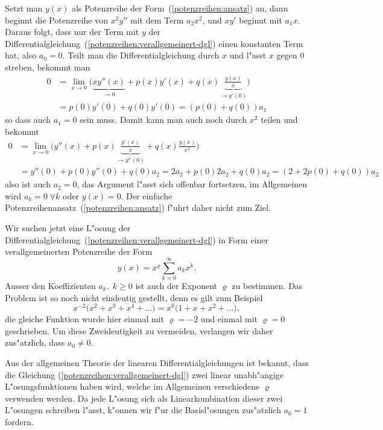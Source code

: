 Setzt man $y(x)$ als Potenzreihe der Form~(\ref{potenzreihen:ansatz}) an,
dann beginnt die Potenzreihe von $x^2y''$ mit dem Term $a_2x^2$,
und $xy'$ beginnt mit $a_1x$.
Daraus folgt, dass nur der Term mit $y$ der
Differentialgleichung~(\ref{potenzreihen:verallgemeinert-dgl})
einen konstanten Term hat, also $a_0=0$.
Teilt man die Differentialgleichung durch $x$ und l"asst $x$ gegen $0$
streben, bekommt man
\begin{align*}
0&=
\lim_{x\to 0}\biggl(
\underbrace{xy''(x)}_{\to 0}+p(x)y'(x)+q(x)\underbrace{\frac{y(x)}{x}}_{\to y'(0)}\biggr)
\\
&=
p(0)y'(0)+q(0)y'(0)
=(p(0)+q(0))a_1
\end{align*}
so dass auch $a_1=0$ sein muss.
Damit kann man auch noch durch $x^2$ teilen und bekommt
\begin{align*}
0&=
\lim_{x\to 0}\biggl(
y''(x)+p(x)\underbrace{\frac{y'(x)}{x}}_{\to y''(0)}+q(x)\frac{y(x)}{x^2}
\biggr)
\\
&=y''(0)+p(0)y''(0)+q(0)a_2
=2a_2+p(0)2a_2+q(0)a_2
=(2+2p(0)+q(0))a_2
\end{align*}
also ist auch $a_2=0$, das Argument l"asst sich offenbar fortsetzen, 
im Allgemeinen wird $a_k=0\;\forall k$ oder $y(x)=0$.
Der einfache Potenzreihenansatz~(\ref{potenzreihen:ansatz}) f"uhrt
daher nicht zum Ziel.

Wir suchen jetzt eine L"osung der
Differentialgleichung~(\ref{potenzreihen:verallgemeinert-dgl})
in Form einer verallgemeinerten Potenzreihe der Form
\begin{equation}
y(x)=x^\varrho\sum_{k=0}^\infty a_kx^k.
\label{potenzreihen:verallgemeinert}
\end{equation}
%
Ausser den Koeffizienten $a_k,\;k\ge 0$ ist auch der Exponent
$\varrho$ zu bestimmen.
Das Problem ist so noch nicht eindeutig gestellt, denn es gilt zum Beispiel
\[
x^{-2}\bigl(x^2 + x^3 + x^4 + \dots\bigr)
=
x^{0}\bigl(1+x + x^2 + \dots\bigr),
\]
die gleiche Funktion wurde hier einmal mit $\varrho=-2$ und einmal
mit $\varrho=0$ geschrieben.
Um diese Zweideutigkeit zu vermeiden,
verlangen wir daher zus"atzlich, dass $a_0\ne 0$.

Aus der allgemeinen Theorie der linearen Differentialgleichungen
ist bekannt, dass die Gleichung (\ref{potenzreihen:verallgemeinert-dgl})
zwei linear unabh"angige L"osungsfunktionen haben wird,
welche im Allgemeinen verschiedene $\varrho$ verwenden werden.
Da jede L"osung sich als Linearkombination dieser zwei L"osungen schreiben
l"asst, k"onnen wir f"ur die Basisl"osungen zus"atzlich $a_0=1$ fordern.

